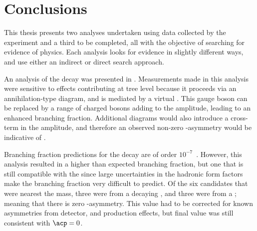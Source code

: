 \chapter{Conclusions}
\label{ch:conc}


This thesis presents two analyses undertaken using data collected by the \lhcb experiment
and a third to be completed, all
with the objective of searching for evidence of \bsm physics.
Each analysis looks for evidence in slightly different ways, and use either an indirect or direct
search approach.

An analysis of the decay \btodsphi was presented in .
Measurements made in this analysis were sensitive to \np effects contributing at tree
level because it proceeds via an annihilation-type diagram, and is mediated by a virtual \Wp.
This gauge boson can be replaced by a range of charged bosons adding to the amplitude, leading to
an enhanced branching fraction.
Additional \np diagrams would also introduce a cross-term in the amplitude, and therefore an
observed non-zero \CP-asymmetry would be indicative of \np.

Branching fraction predictions for the decay \btodsphi are of order
$10^{-7}$~\cite{Zou:2009zza,Mohanta:2002wf,PhysRevD.76.057701,Lu:2001yz}.
However, this analysis resulted in a higher than expected branching fraction, but one that is
still compatible with the \sm since large uncertainties in the hadronic form factors make the
branching fraction very difficult to predict.
Of the six candidates that were nearest the \Bp mass, three were from a decaying \Bp, and three
were from a \Bm; meaning that there is zero \CP-asymmetry.
This value had to be corrected for known asymmetries from detector, and production effects, but
final value was still consistent with $\acp=0$.


